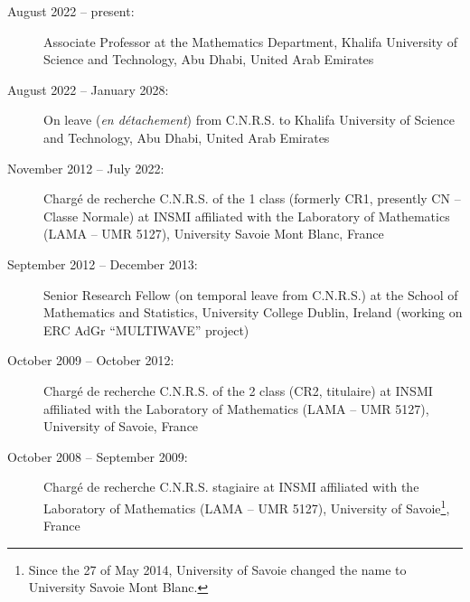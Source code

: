 \documentclass[final, a4paper, oneside, 12pt]{article}
\numberwithin{equation}{section}
\begin{document}
\begin{description}

  \item[August 2022 -- present:] Associate Professor at the Mathematics Department, Khalifa University of Science and Technology, Abu Dhabi, United Arab Emirates


  \item[August 2022 -- January 2028:] On leave (\textit{en d\'etachement}) from C.N.R.S. to Khalifa University of Science and Technology, Abu Dhabi, United Arab Emirates


  \item[November 2012 -- July 2022:] Charg\'e de recherche C.N.R.S. of the 1 class (formerly CR1, presently CN -- Classe Normale) at INSMI affiliated with the Laboratory of Mathematics (LAMA -- UMR 5127), University Savoie Mont Blanc, France

  
  \item[September 2012 -- December 2013:] Senior Research Fellow (on temporal leave from C.N.R.S.) at the School of Mathematics and Statistics, University College Dublin, Ireland (working on ERC AdGr ``MULTIWAVE'' project)
    
  \item[October 2009 -- October 2012:] Charg\'e de recherche C.N.R.S. of the 2 class (CR2, titulaire) at INSMI affiliated with the Laboratory of Mathematics (LAMA -- UMR 5127), University of Savoie, France
  
  \item[October 2008 -- September 2009:] Charg\'e de recherche C.N.R.S. stagiaire at INSMI affiliated with the Laboratory of Mathematics (LAMA -- UMR 5127), University of Savoie\footnote{Since the 27 of May 2014, University of Savoie changed the name to University Savoie Mont Blanc.\label{fn:usmb}}, France
  

\end{description}
\end{document}
